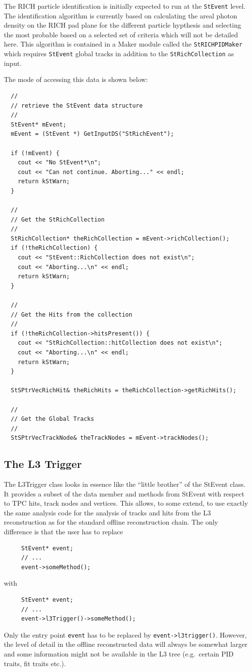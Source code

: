 \documentclass[twoside]{article}
\begin{document}
The RICH particle identification is initially expected to run
at the \texttt{StEvent} level.  The identification algorithm is currently
based on calculating the areal photon density on the RICH pad
plane for the different particle hypthesis and selecting the
most probable based on a selected set of criteria which will
not be detailed here.  This algorithm is contained in a
Maker module called the \texttt{StRICHPIDMaker} which requires
\texttt{StEvent} global tracks in addition to the \texttt{StRichCollection}
as input.

The mode of accessing this data is shown below:

\begin{verbatim}
  //
  // retrieve the StEvent data structure
  //
  StEvent* mEvent;
  mEvent = (StEvent *) GetInputDS("StRichEvent");

  if (!mEvent) {
    cout << "No StEvent*\n";
    cout << "Can not continue. Aborting..." << endl;
    return kStWarn;
  }

  //
  // Get the StRichCollection
  // 
  StRichCollection* theRichCollection = mEvent->richCollection();
  if (!theRichCollection) {
    cout << "StEvent::RichCollection does not exist\n";
    cout << "Aborting...\n" << endl;
    return kStWarn;
  }

  //
  // Get the Hits from the collection
  //
  if (!theRichCollection->hitsPresent()) {
    cout << "StRichCollection::hitCollection does not exist\n";
    cout << "Aborting...\n" << endl;
    return kStWarn;
  }

  StSPtrVecRichHit& theRichHits = theRichCollection->getRichHits();

  //
  // Get the Global Tracks
  //
  StSPtrVecTrackNode& theTrackNodes = mEvent->trackNodes();
\end{verbatim}

\subsection{The L3 Trigger}

The L3Trigger class looks in essence like the ``little brother'' of
the StEvent class. It provides a subset of the data member and methods
from StEvent with respect to TPC hits, track nodes and vertices.  This
allows, to some extend, to use exactly the same analysis code for the
analysis of tracks and hits from the L3 reconstruction as for the
standard offline reconstruction chain.
The only difference is that
the user has to replace
\begin{verbatim}
     StEvent* event;
     // ...
     event->someMethod();
\end{verbatim}
with
\begin{verbatim}
     StEvent* event;
     // ...
     event->l3Trigger()->someMethod();
\end{verbatim}
Only the entry point \texttt{event} has to be replaced by \texttt{event->l3trigger()}.
However, the level of detail in the offline reconstructed data will
always be somewhat larger and some information might not be available in the L3
tree (e.g.~certain PID traits, fit traits etc.).
\end{document}
